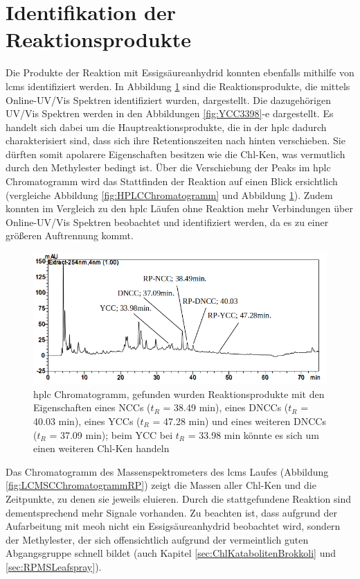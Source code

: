 \pagebreak
\section{Identifikation der Reaktionsprodukte}

Die Produkte der Reaktion mit Essigsäureanhydrid konnten ebenfalls mithilfe von \gls{lcms} identifiziert werden. In Abbildung \ref{fig:HPLCChromatogrammRP} sind die Reaktionsprodukte, die mittels Online-UV/Vis Spektren identifiziert wurden, dargestellt. Die dazugehörigen UV/Vis Spektren werden in den Abbildungen \ref{fig:YCC3398}-e dargestellt. Es handelt sich dabei um die Hauptreaktionsprodukte, die in der \gls{hplc} dadurch charakterisiert sind, dass sich ihre Retentionszeiten nach hinten verschieben. Sie dürften somit apolarere Eigenschaften besitzen wie die \gls{Chl-K}en, was vermutlich durch den Methylester bedingt ist. Über die Verschiebung der Peaks im \gls{hplc} Chromatogramm wird das Stattfinden der Reaktion auf einen Blick ersichtlich (vergleiche Abbildung \ref{fig:HPLCChromatogramm} und Abbildung \ref{fig:HPLCChromatogrammRP}). Zudem konnten im Vergleich zu den \gls{hplc} Läufen ohne Reaktion mehr Verbindungen über Online-UV/Vis Spektren beobachtet und identifiziert werden, da es zu einer größeren Auftrennung kommt.

\begin{figure}[!htbp]
  \includegraphics[width=\textwidth]{figures/Kapitel6/Reaktion3h/HPLC_Chromatogramm.png}
  \caption[HPLC Chromatogramm nach 3 h Reaktionsdauer, Quelle: Autor]{\gls{hplc} Chromatogramm, gefunden wurden Reaktionsprodukte mit den Eigenschaften eines NCCs ($t_R$ = 38.49 min), eines DNCCs ($t_R$ = 40.03 min), eines YCCs ($t_R$ = 47.28 min) und eines weiteren DNCCs ($t_R$ = 37.09 min); beim YCC bei $t_R$ = 33.98 min könnte es sich um einen weiteren \gls{Chl-K}en handeln}
  \label{fig:HPLCChromatogrammRP}
\end{figure}

Das Chromatogramm des Massenspektrometers des \gls{lcms} Laufes (Abbildung \ref{fig:LCMSCChromatogrammRP}) zeigt die Massen aller \gls{Chl-K}en und die Zeitpunkte, zu denen sie jeweils eluieren. Durch die stattgefundene Reaktion sind dementsprechend mehr Signale vorhanden. Zu beachten ist, dass aufgrund der Aufarbeitung mit \gls{meoh} nicht ein Essigsäureanhydrid beobachtet wird, sondern der Methylester, der sich offensichtlich aufgrund der vermeintlich guten Abgangsgruppe  schnell bildet (auch Kapitel \ref{sec:ChlKatabolitenBrokkoli} und \ref{sec:RPMSLeafspray}). \\

